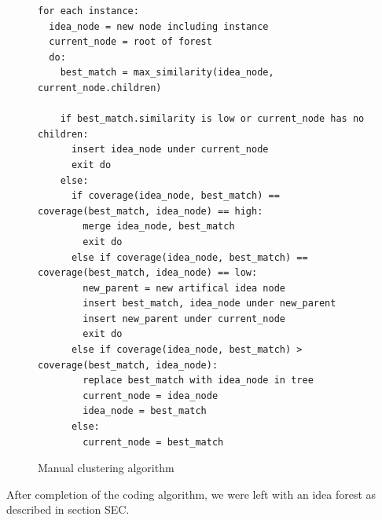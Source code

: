 \begin{figure}[h]
\begin{verbatim}
for each instance:
  idea_node = new node including instance
  current_node = root of forest
  do:
    best_match = max_similarity(idea_node, current_node.children)

    if best_match.similarity is low or current_node has no children:
      insert idea_node under current_node
      exit do
    else:
      if coverage(idea_node, best_match) == coverage(best_match, idea_node) == high:
        merge idea_node, best_match
        exit do
      else if coverage(idea_node, best_match) == coverage(best_match, idea_node) == low:
        new_parent = new artifical idea node
        insert best_match, idea_node under new_parent
        insert new_parent under current_node
        exit do
      else if coverage(idea_node, best_match) > coverage(best_match, idea_node):
        replace best_match with idea_node in tree
        current_node = idea_node
        idea_node = best_match
      else:
        current_node = best_match
\end{verbatim}
\caption{Manual clustering algorithm}
\label{fig:cluseringalg}
\end{figure}

After completion of the coding algorithm, we were left with an idea forest as described in section SEC.

